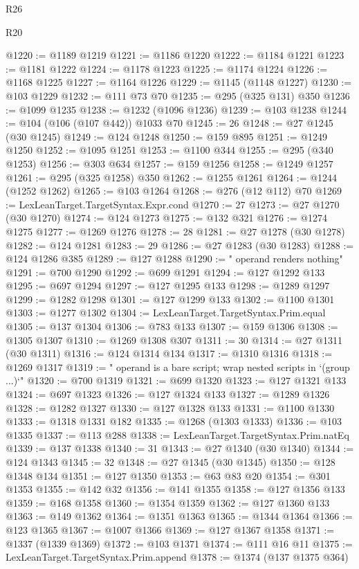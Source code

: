 \begin{lexlean}{R26}
\begin{lexlean}{R20}
\begin{coremodule}
{{{{{{{{{{{{{{{{{{{{{{{{{{{{{{{{{{{{{{{{{{{{{{{{{{{{{{{{{{{{{{{@1220 := @1189 @1219
@1221 := @1186 @1220
@1222 := @1184 @1221
@1223 := @1181 @1222
@1224 := @1178 @1223
@1225 := @1174 @1224
@1226 := @1168 @1225
@1227 := @1164 @1226
@1229 := @1145 (@1148 @1227)
@1230 := @103 @1229
@1232 := @111 @73 @70
@1235 := @295 (@325 @131) @350
@1236 := @1099 @1235
@1238 := @1232 (@1096 @1236)
@1239 := @103 @1238
@1244 := @104 (@106 (@107 @442)) @1033 @70
@1245 := 26
@1248 := @27 @1245 (@30 @1245)
@1249 := @124 @1248
@1250 := @159 @895
@1251 := @1249 @1250
@1252 := @1095 @1251
@1253 := @1100 @344
@1255 := @295 (@340 @1253)
@1256 := @303 @634
@1257 := @159 @1256
@1258 := @1249 @1257
@1261 := @295 (@325 @1258) @350
@1262 := @1255 @1261
@1264 := @1244 (@1252 @1262)
@1265 := @103 @1264
@1268 := @276 (@12 @112) @70
@1269 := LexLeanTarget.TargetSyntax.Expr.cond
@1270 := 27
@1273 := @27 @1270 (@30 @1270)
@1274 := @124 @1273
@1275 := @132 @321
@1276 := @1274 @1275
@1277 := @1269 @1276
@1278 := 28
@1281 := @27 @1278 (@30 @1278)
@1282 := @124 @1281
@1283 := 29
@1286 := @27 @1283 (@30 @1283)
@1288 := @124 @1286 @385
@1289 := @127 @1288
@1290 := " operand renders nothing"
@1291 := @700 @1290
@1292 := @699 @1291
@1294 := @127 @1292 @133
@1295 := @697 @1294
@1297 := @127 @1295 @133
@1298 := @1289 @1297
@1299 := @1282 @1298
@1301 := @127 @1299 @133
@1302 := @1100 @1301
@1303 := @1277 @1302
@1304 := LexLeanTarget.TargetSyntax.Prim.equal
@1305 := @137 @1304
@1306 := @783 @133
@1307 := @159 @1306
@1308 := @1305 @1307
@1310 := @1269 @1308 @307
@1311 := 30
@1314 := @27 @1311 (@30 @1311)
@1316 := @124 @1314 @134
@1317 := @1310 @1316
@1318 := @1269 @1317
@1319 := " operand is a bare script; wrap nested scripts in `(group ...)`"
@1320 := @700 @1319
@1321 := @699 @1320
@1323 := @127 @1321 @133
@1324 := @697 @1323
@1326 := @127 @1324 @133
@1327 := @1289 @1326
@1328 := @1282 @1327
@1330 := @127 @1328 @133
@1331 := @1100 @1330
@1333 := @1318 @1331 @182
@1335 := @1268 (@1303 @1333)
@1336 := @103 @1335
@1337 := @113 @288
@1338 := LexLeanTarget.TargetSyntax.Prim.natEq
@1339 := @137 @1338
@1340 := 31
@1343 := @27 @1340 (@30 @1340)
@1344 := @124 @1343
@1345 := 32
@1348 := @27 @1345 (@30 @1345)
@1350 := @128 @1348 @134
@1351 := @127 @1350
@1353 := @63 @83 @20
@1354 := @301 @1353
@1355 := @142 @32
@1356 := @141 @1355
@1358 := @127 @1356 @133
@1359 := @168 @1358
@1360 := @1354 @1359
@1362 := @127 @1360 @133
@1363 := @149 @1362
@1364 := @1351 @1363
@1365 := @1344 @1364
@1366 := @123 @1365
@1367 := @1007 @1366
@1369 := @127 @1367 @1358
@1371 := @1337 (@1339 @1369)
@1372 := @103 @1371
@1374 := @111 @16 @11
@1375 := LexLeanTarget.TargetSyntax.Prim.append
@1378 := @1374 (@137 @1375 @364)
}}}}}}}}}}}}}}}}}}}}}}}}}}}}}}}}}}}}}}}}}}}}}}}}}}}}}}}}}}}}}}}
\end{coremodule}
\end{lexlean}
\end{lexlean}
